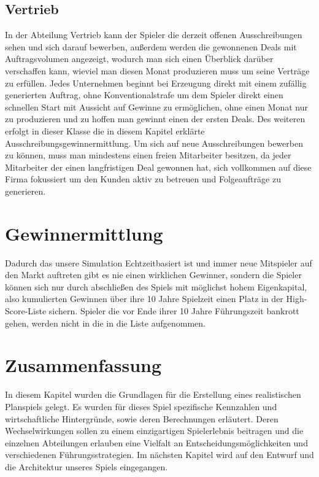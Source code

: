 \subsection{Vertrieb}
In der Abteilung Vertrieb kann der Spieler die derzeit offenen Ausschreibungen sehen und sich darauf bewerben, außerdem werden die gewonnenen Deals mit Auftragsvolumen angezeigt, wodurch man sich einen Überblick darüber verschaffen kann, wieviel man diesen Monat produzieren muss um seine Verträge zu erfüllen. Jedes Unternehmen beginnt bei Erzeugung direkt mit einem zufällig generierten Auftrag, ohne Konventionalstrafe um dem Spieler direkt einen schnellen Start mit Aussicht auf Gewinne zu ermöglichen, ohne einen Monat nur zu produzieren und zu hoffen man gewinnt einen der ersten Deals. Des weiteren erfolgt in dieser Klasse die in diesem Kapitel erklärte Ausschreibungsgewinnermittlung. Um sich auf neue Ausschreibungen bewerben zu können, muss man mindestens einen freien Mitarbeiter besitzen, da jeder Mitarbeiter der einen langfristigen Deal gewonnen hat, sich vollkommen auf diese Firma fokussiert um den Kunden aktiv zu betreuen und Folgeaufträge zu generieren. 

\section{Gewinnermittlung}
Dadurch das unsere Simulation Echtzeitbasiert ist und immer neue Mitspieler auf den Markt auftreten gibt es nie einen wirklichen Gewinner, sondern die Spieler können sich nur durch abschließen des Spiels mit möglichst hohem Eigenkapital, also kumulierten Gewinnen über ihre 10 Jahre Spielzeit einen Platz in der High-Score-Liste sichern. Spieler die vor Ende ihrer 10 Jahre Führungszeit bankrott gehen, werden nicht in die in die Liste aufgenommen.

\section{Zusammenfassung}
In diesem Kapitel wurden die Grundlagen für die Erstellung eines realistischen Planspiels gelegt. Es wurden für dieses Spiel spezifische Kennzahlen und wirtschaftliche Hintergründe, sowie deren Berechnungen erläutert. Deren Wechselwirkungen sollen zu einem einzigartigen Spielerlebnis beitragen und die einzelnen Abteilungen erlauben eine Vielfalt an Entscheidungsmöglichkeiten und verschiedenen Führungsstrategien. Im nächsten Kapitel wird auf den Entwurf und die Architektur unseres Spiels eingegangen.